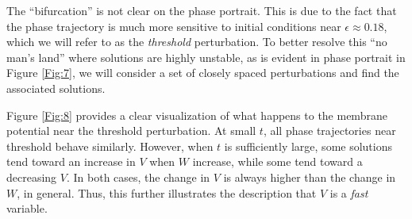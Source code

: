 \documentclass{book}
\theoremstyle{definition}
\begin{document}
The ``bifurcation'' is not clear on the phase portrait. This is due to the fact that the phase trajectory is much more sensitive to initial conditions near $\epsilon \approx 0.18$, which we will refer to as the \textit{threshold} perturbation. To better resolve this ``no man's land'' where solutions are highly unstable, as is evident in phase portrait in Figure \ref{Fig:7}, we will consider a set of closely spaced perturbations and find the associated solutions. 


Figure \ref{Fig:8} provides a clear visualization of what happens to the membrane potential near the threshold perturbation. At small $t$, all phase trajectories near threshold behave similarly. However, when $t$ is sufficiently large, some solutions tend toward an increase in $V$ when $W$ increase, while some tend toward a decreasing $V$. In both cases, the change in $V$ is always higher than the change in $W$, in general. Thus, this further illustrates the description that $V$ is a \textit{fast} variable.  
\end{document}
